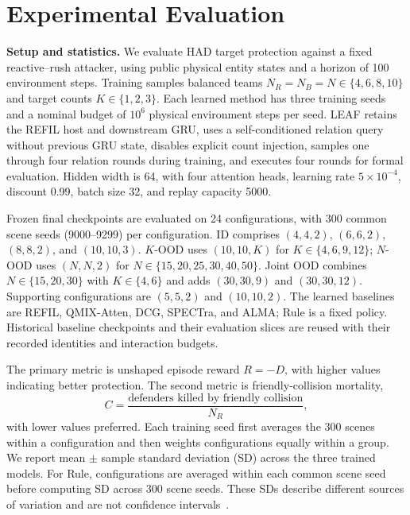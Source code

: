 ﻿\section{Experimental Evaluation}
\label{sec:results}


\noindent\textbf{Setup and statistics.}
We evaluate HAD target protection against a fixed reactive--rush attacker, using public physical entity states and a horizon of 100 environment steps. Training samples balanced teams $N_R=N_B=N\in\{4,6,8,10\}$ and target counts $K\in\{1,2,3\}$. Each learned method has three training seeds and a nominal budget of $10^6$ physical environment steps per seed. LEAF retains the REFIL host and downstream GRU, uses a self-conditioned relation query without previous GRU state, disables explicit count injection, samples one through four relation rounds during training, and executes four rounds for formal evaluation. Hidden width is 64, with four attention heads, learning rate $5\times10^{-4}$, discount 0.99, batch size 32, and replay capacity 5000.

Frozen final checkpoints are evaluated on 24 configurations, with 300 common scene seeds (9000--9299) per configuration. ID comprises $(4,4,2)$, $(6,6,2)$, $(8,8,2)$, and $(10,10,3)$. $K$-OOD uses $(10,10,K)$ for $K\in\{4,6,9,12\}$; $N$-OOD uses $(N,N,2)$ for $N\in\{15,20,25,30,40,50\}$. Joint OOD combines $N\in\{15,20,30\}$ with $K\in\{4,6\}$ and adds $(30,30,9)$ and $(30,30,12)$. Supporting configurations are $(5,5,2)$ and $(10,10,2)$. The learned baselines are REFIL, QMIX-Atten, DCG, SPECTra, and ALMA; Rule is a fixed policy. Historical baseline checkpoints and their evaluation slices are reused with their recorded identities and interaction budgets.

The primary metric is unshaped episode reward $R=-D$, with higher values indicating better protection. The second metric is friendly-collision mortality,
\begin{equation}
 C=\frac{\text{defenders killed by friendly collision}}{N_R},
\end{equation}
with lower values preferred. Each training seed first averages the 300 scenes within a configuration and then weights configurations equally within a group. We report mean $\pm$ sample standard deviation (SD) across the three trained models. For Rule, configurations are averaged within each common scene seed before computing SD across 300 scene seeds. These SDs describe different sources of variation and are not confidence intervals~\cite{agarwal2021rliable}.

